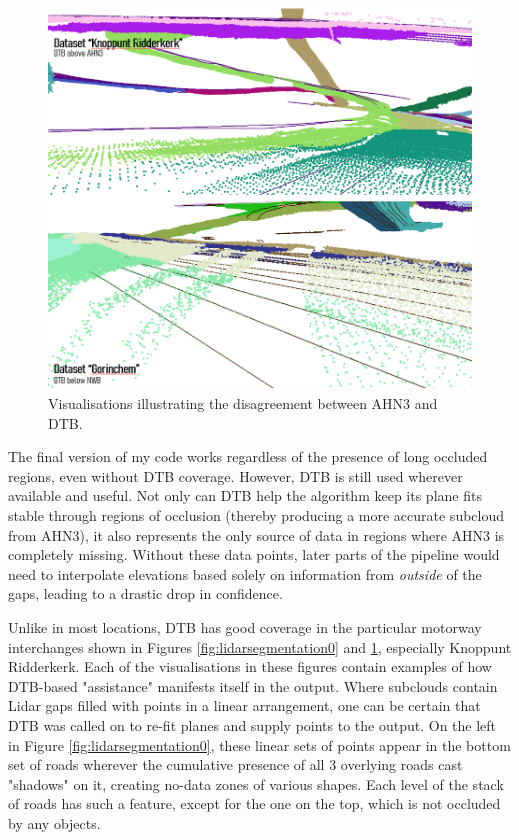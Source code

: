 \begin{figure}[]
    \centering
    \includegraphics[width=0.9\linewidth]{final_report/figs/lidarsegmentation1.png}
    \caption{Visualisations illustrating the disagreement between AHN3 and DTB.}
    \label{fig:lidarsegmentation1}
\end{figure}

The final version of my code works regardless of the presence of long occluded regions, even without DTB coverage. However, DTB is still used wherever available and useful. Not only can DTB help the algorithm keep its plane fits stable through regions of occlusion (thereby producing a more accurate subcloud from AHN3), it also represents the only source of data in regions where AHN3 is completely missing. Without these data points, later parts of the pipeline would need to interpolate elevations based solely on information from \textit{outside} of the gaps, leading to a drastic drop in confidence.

Unlike in most locations, DTB has good coverage in the particular motorway interchanges shown in Figures \ref{fig:lidarsegmentation0} and \ref{fig:lidarsegmentation1}, especially Knoppunt Ridderkerk. Each of the visualisations in these figures contain examples of how DTB-based "assistance" manifests itself in the output. Where subclouds contain Lidar gaps filled with points in a linear arrangement, one can be certain that DTB was called on to re-fit planes and supply points to the output. On the left in Figure \ref{fig:lidarsegmentation0}, these linear sets of points appear in the bottom set of roads wherever the cumulative presence of all 3 overlying roads cast "shadows" on it, creating no-data zones of various shapes. Each level of the stack of roads has such a feature, except for the one on the top, which is not occluded by any objects.

